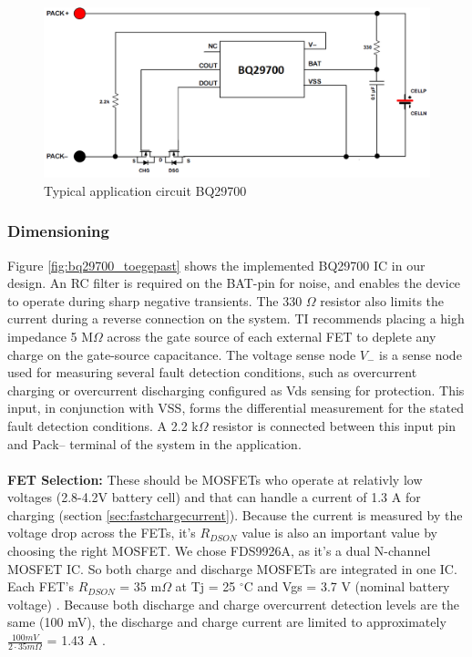 \documentclass[11pt,a4paper]{article}
\begin{document}
\begin{figure}[H]
	\centering
	\includegraphics[width=0.9\linewidth]{bq29700_principeschema.png}
	\caption{Typical application circuit BQ29700 \cite{bib:BQ29700}}
	\label{fig:bq29700_principeschema}
\end{figure}

\subsubsection{Dimensioning}
Figure \ref{fig:bq29700_toegepast} shows the implemented BQ29700 IC in our design. An RC filter is required on the BAT-pin for noise, and enables the device to operate during sharp negative transients. The 330 $\Omega$ resistor also limits the current during a reverse connection on the system. TI recommends placing a high impedance 5 M$\Omega$ across the gate source of each external FET to deplete any charge on the gate-source capacitance. The voltage sense node $V_-$ is a sense node used for measuring several fault detection conditions, such as overcurrent charging or
overcurrent discharging configured as Vds sensing for protection. This input, in conjunction with VSS, forms the differential measurement for the stated fault detection conditions. A 2.2 k$\Omega$ resistor is connected between this input pin and Pack– terminal of the system in the application.
\\ \\
\textbf{FET Selection:} These should be MOSFETs who operate at relativly low voltages (2.8-4.2V battery cell) and that can handle a current of 1.3 A for charging (section \ref{sec:fastchargecurrent}). Because the current is measured by the voltage drop across the FETs, it's $R_{DSON}$ value is also an important value by choosing the right MOSFET. We chose FDS9926A, as it's a dual N-channel MOSFET IC. So both charge and discharge MOSFETs are integrated in one IC. Each FET's $R_{DSON}$ = 35 m$\Omega$ at Tj = 25 $^\circ$C and Vgs = 3.7 V (nominal battery voltage) \cite{bib:FDS9926A}. Because both discharge and charge overcurrent detection levels are the same (100 mV), the discharge and charge current are limited to approximately $\frac{100 mV}{2 \cdot 35m\Omega}$ = 1.43 A \cite{bib:BQ29700, bib:FDS9926A}.
\end{document}
